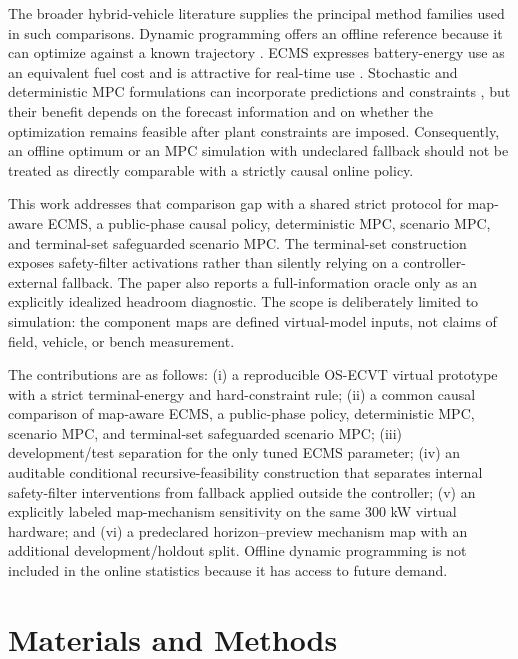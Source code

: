 \documentclass[agriengineering,article,submit,moreauthors]{Definitions/mdpi}
\begin{document}
The broader hybrid-vehicle literature supplies the principal method families used in such comparisons. Dynamic programming offers an offline reference because it can optimize against a known trajectory \cite{xie2016}. ECMS expresses battery-energy use as an equivalent fuel cost and is attractive for real-time use \cite{musardo2005}. Stochastic and deterministic MPC formulations can incorporate predictions and constraints \cite{ripaccioli2010,zhang2017,wang2016}, but their benefit depends on the forecast information and on whether the optimization remains feasible after plant constraints are imposed. Consequently, an offline optimum or an MPC simulation with undeclared fallback should not be treated as directly comparable with a strictly causal online policy.

This work addresses that comparison gap with a shared strict protocol for map-aware ECMS, a public-phase causal policy, deterministic MPC, scenario MPC, and terminal-set safeguarded scenario MPC. The terminal-set construction exposes safety-filter activations rather than silently relying on a controller-external fallback. The paper also reports a full-information oracle only as an explicitly idealized headroom diagnostic. The scope is deliberately limited to simulation: the component maps are defined virtual-model inputs, not claims of field, vehicle, or bench measurement.

The contributions are as follows: (i) a reproducible OS-ECVT virtual prototype with a strict terminal-energy and hard-constraint rule; (ii) a common causal comparison of map-aware ECMS, a public-phase policy, deterministic MPC, scenario MPC, and terminal-set safeguarded scenario MPC; (iii) development/test separation for the only tuned ECMS parameter; (iv) an auditable conditional recursive-feasibility construction that separates internal safety-filter interventions from fallback applied outside the controller; (v) an explicitly labeled map-mechanism sensitivity on the same 300 kW virtual hardware; and (vi) a predeclared horizon--preview mechanism map with an additional development/holdout split. Offline dynamic programming is not included in the online statistics because it has access to future demand.

\section{Materials and Methods}
\end{document}
